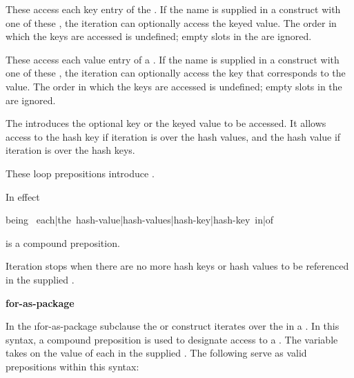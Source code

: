  
These  access each key entry of the .  If 
the name  is supplied in a  construct with one
of these {\LoopSchemas}, the iteration can optionally access the keyed
value. The order in which the keys are accessed is undefined; empty
slots in the  are ignored.  
 
 
These  access each value entry of a 
.  If 
the name  is supplied in a  construct with one of
these {\LoopSchemas}, the iteration can optionally access the key that
corresponds to the value.  The order in which the keys are accessed is
undefined; empty slots in the  are ignored. 
 
 
The   introduces 
the optional key or the keyed value to
be accessed.  It allows access to the hash key if iteration is over
the hash values, and the hash value if 
iteration is over the hash keys.
 
 
These loop prepositions introduce .
 
\endlist

In effect 

\code
being \lbracket\ each|the\rbracket \lbracket\ hash-value|hash-values|hash-key|hash-key\rbracket \lbracket\ in|of\rbracket 
\endcode

is a compound preposition.
 
Iteration stops when there are no more hash keys or hash values to be
referenced in the supplied .


{\bf for-as-package}

In the \i{for-as-package} subclause
the  
or  construct                    
iterates over the  in a .
In this syntax, a compound preposition is used to designate access to a
.
The variable  takes on the value of each 
in the supplied .  
 The following  serve as valid prepositions within this syntax:
 
\beginlist
 
